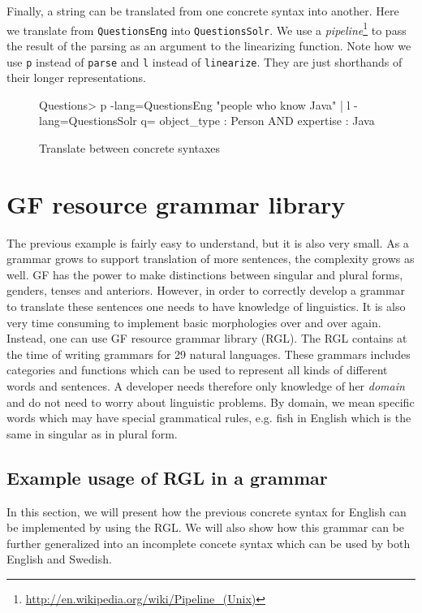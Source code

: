 Finally, a string can be translated from one concrete syntax into another. Here we translate from \texttt{QuestionsEng} into \texttt{QuestionsSolr}. We use a \emph{pipeline}\footnote{\url{http://en.wikipedia.org/wiki/Pipeline_(Unix)}} to pass the result of the parsing as an argument to the linearizing function. Note how we use \texttt{p} instead of \texttt{parse} and \texttt{l} instead of \texttt{linearize}. They are just shorthands of their longer representations.

\begin{figure}[H]
\begin{terminal}
Questions> p -lang=QuestionsEng "people who know Java" | l -lang=QuestionsSolr
q= object_type : Person AND expertise : Java
\end{terminal}
\caption{Translate between concrete syntaxes\label{fig:translation-concr}}
\end{figure}


\section{GF resource grammar library}

The previous example is fairly easy to understand, but it is also very small. As a grammar grows to support translation of more sentences, the complexity grows as well. GF has the power to make distinctions between singular and plural forms, genders, tenses and anteriors. However, in order to correctly develop a grammar to translate these sentences one needs to have knowledge of linguistics. It is also very time consuming to implement basic morphologies over and over again. Instead, one can use GF resource grammar library (RGL). The RGL contains at the time of writing grammars for 29 natural languages. These grammars includes categories and functions which can be used to represent all kinds of different words and sentences. A developer needs therefore only knowledge of her \emph{domain} and do not need to worry about linguistic problems. By domain, we mean specific words which may have special grammatical rules, e.g. fish in English which is the same in singular as in plural form.

\subsection{Example usage of RGL in a grammar}

In this section, we will present how the previous concrete syntax for English can be implemented by using the RGL. We will also show how this grammar can be further generalized into an incomplete concete syntax which can be used by both English and Swedish.

